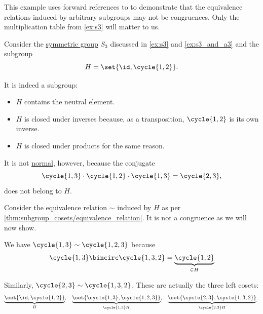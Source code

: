 \begin{example}\label{ex:quotient_by_non_normal_subgroup}
  This example uses forward references to  to demonstrate that the equivalence relations induced by arbitrary subgroups may not be congruences. Only the multiplication table from \cref{ex:s3} will matter to us.

  Consider the \hyperref[def:symmetric_group]{symmetric group} \( S_3 \) discussed in \cref{ex:s3} and \cref{ex:s3_and_a3} and the subgroup
  \begin{equation*}
    H = \set{ \id, \cycle{ 1, 2 } }.
  \end{equation*}

  It is indeed a subgroup:
  \begin{itemize}
    \item \( H \) contains the neutral element.
    \item \( H \) is closed under inverses because, as a transposition, \( \cycle{ 1, 2 } \) is its own inverse.
    \item \( H \) is closed under products for the same reason.
  \end{itemize}

  It is not \hyperref[def:normal_subgroup]{normal}, however, because the conjugate
  \begin{equation*}
    \cycle{ 1, 3 }
    \cdot
    \cycle{ 1, 2 }
    \cdot
    \cycle{ 1, 3 }
    =
    \cycle{ 2, 3 },
  \end{equation*}
  does not belong to \( H \).

  Consider the equivalence relation \( {\sim} \) induced by \( H \) as per \cref{thm:subgroup_cosets/equivalence_relation}. It is not a congruence as we will now show.

  We have \( \cycle{ 1, 3 } \sim \cycle{ 1, 2, 3 } \) because
  \begin{equation*}
    \cycle{ 1, 3 } \bincirc \cycle{ 1, 3, 2 }
    =
    \underbrace{\cycle{ 1, 2 }}_{\in H}
  \end{equation*}

  Similarly, \( \cycle{ 2, 3 } \sim \cycle{ 1, 3, 2 } \). These are actually the three left cosets:
  \begin{align*}
    \underbrace{ \set{ \id, \cycle{ 1, 2 } } }_{ H },
    &&
    \underbrace{ \set{ \cycle{ 1, 3 }, \cycle{ 1, 2, 3 } } }_{ \cycle{ 1, 3 } H },
    &&
    \underbrace{ \set{ \cycle{ 2, 3 }, \cycle{ 1, 3, 2 } } }_{ \cycle{ 2, 3 } H }.
  \end{align*}


\end{example}
